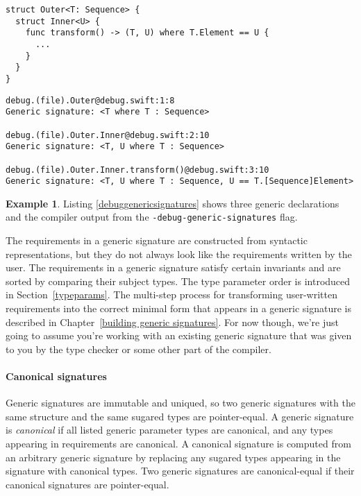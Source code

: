 \documentclass[a4paper,headsepline,bibliography=totoc,toc=flat,fleqn,twoside=semi]{scrbook}
\theoremstyle{definition}
\theoremstyle{definition}
\newtheorem{example}{Example}[chapter]
\theoremstyle{definition}
\begin{document}
\begin{listing}\label{debuggenericsignatures}
\begin{Verbatim}
struct Outer<T: Sequence> {
  struct Inner<U> {
    func transform() -> (T, U) where T.Element == U {
      ...
    }
  }
}
\end{Verbatim}
\begin{Verbatim}
debug.(file).Outer@debug.swift:1:8
Generic signature: <T where T : Sequence>

debug.(file).Outer.Inner@debug.swift:2:10
Generic signature: <T, U where T : Sequence>

debug.(file).Outer.Inner.transform()@debug.swift:3:10
Generic signature: <T, U where T : Sequence, U == T.[Sequence]Element>
\end{Verbatim}
\end{listing}

\begin{example}
Listing \ref{debuggenericsignatures} shows three generic declarations and the compiler output from the \texttt{-debug-generic-signatures} flag.
\end{example}
The requirements in a generic signature are constructed from syntactic representations, but they do not always look like the requirements written by the user. The requirements in a generic signature satisfy certain invariants and are sorted by comparing their subject types. The type parameter order is introduced in Section~\ref{typeparams}. The multi-step process for transforming user-written requirements into the correct minimal form that appears in a generic signature is described in Chapter~\ref{building generic signatures}. For now though, we're just going to assume you're working with an existing generic signature that was given to you by the type checker or some other part of the compiler.

\paragraph{Canonical signatures}
Generic signatures are immutable and uniqued, so two generic signatures with the same structure and the same sugared types are pointer-equal. A generic signature is \emph{canonical} if all listed generic parameter types are canonical, and any types appearing in requirements are canonical. A canonical signature is computed from an arbitrary generic signature by replacing any sugared types appearing in the signature with canonical types. Two generic signatures are canonical-equal if their canonical signatures are pointer-equal.
\end{document}
